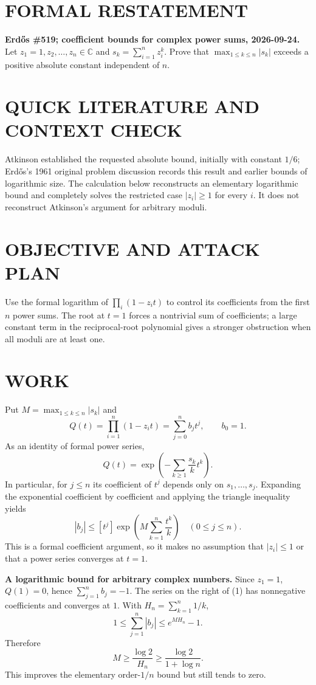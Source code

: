 \section{FORMAL RESTATEMENT}
\textbf{Erd\H{o}s \#519; coefficient bounds for complex power sums, 2026-09-24.}
Let $z_1=1,z_2,\ldots,z_n\in\mathbb C$ and $s_k=\sum_{i=1}^nz_i^k$. Prove that $\max_{1\leq k\leq n}|s_k|$ exceeds a positive absolute constant independent of $n$.

\section{QUICK LITERATURE AND CONTEXT CHECK}
Atkinson established the requested absolute bound, initially with constant $1/6$; Erd\H{o}s's 1961 original problem discussion records this result and earlier bounds of logarithmic size. The calculation below reconstructs an elementary logarithmic bound and completely solves the restricted case $|z_i|\geq1$ for every $i$. It does not reconstruct Atkinson's argument for arbitrary moduli.

\section{OBJECTIVE AND ATTACK PLAN}
Use the formal logarithm of $\prod_i(1-z_it)$ to control its coefficients from the first $n$ power sums. The root at $t=1$ forces a nontrivial sum of coefficients; a large constant term in the reciprocal-root polynomial gives a stronger obstruction when all moduli are at least one.

\section{WORK}
Put $M=\max_{1\leq k\leq n}|s_k|$ and
\[
 Q(t)=\prod_{i=1}^n(1-z_it)=\sum_{j=0}^n b_jt^j,
 \qquad b_0=1.
\]
As an identity of formal power series,
\[
 Q(t)=\exp\left(-\sum_{k\geq1}\frac{s_k}{k}t^k\right).
\]
In particular, for $j\leq n$ its coefficient of $t^j$ depends only on $s_1,\ldots,s_j$. Expanding the exponential coefficient by coefficient and applying the triangle inequality yields
\[
 |b_j|\leq[t^j]\exp\left(M\sum_{k=1}^n\frac{t^k}{k}\right)
 \quad(0\leq j\leq n).                              \tag{1}
\]
This is a formal coefficient argument, so it makes no assumption that $|z_i|\leq1$ or that a power series converges at $t=1$.

\textbf{A logarithmic bound for arbitrary complex numbers.} Since $z_1=1$, $Q(1)=0$, hence $\sum_{j=1}^nb_j=-1$. The series on the right of (1) has nonnegative coefficients and converges at $1$. With $H_n=\sum_{k=1}^n1/k$,
\[
 1\leq\sum_{j=1}^n|b_j|\leq e^{MH_n}-1.
\]
Therefore
\[
 \boxed{\displaystyle M\geq\frac{\log2}{H_n}
              \geq\frac{\log2}{1+\log n}.}            \tag{2}
\]
This improves the elementary order-$1/n$ bound but still tends to zero.

